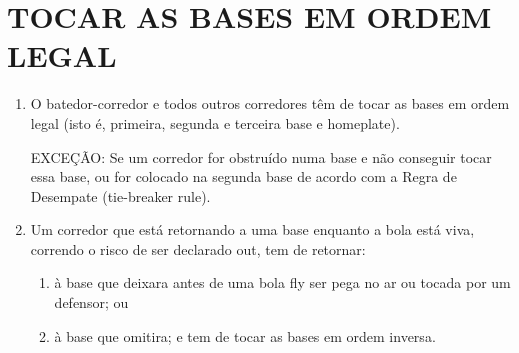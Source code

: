 \section{TOCAR AS BASES EM ORDEM LEGAL}
\begin{enumerate}[label=(\alph*)]
	\item   O batedor-corredor e todos outros corredores têm de tocar as bases em ordem legal (isto é, primeira, segunda e terceira base e \gls{homeplate}).

 EXCEÇÃO: Se um corredor for obstruído numa base e não conseguir tocar essa base, ou for colocado na segunda base de acordo com a Regra de Desempate (\gls{tie-breaker rule}).

	\item  Um corredor que está retornando a uma base enquanto a bola está viva, correndo o risco de ser declarado \gls{out}, tem de retornar:

	 \begin{enumerate}[label=\roman*.]
	 	\item  à base que deixara antes de uma bola \gls{fly} ser pega no ar ou tocada por um defensor; ou
		\item à base que omitira; e tem de tocar as bases em ordem inversa.
	\end{enumerate}


\end{enumerate}
